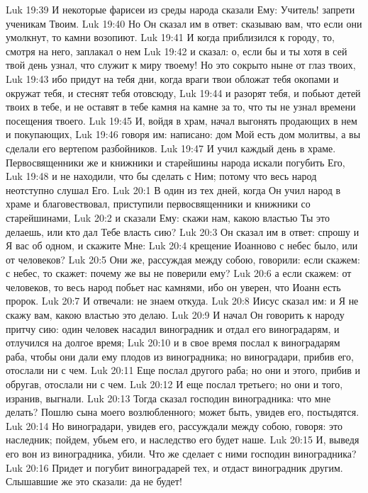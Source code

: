 Luk 19:39  И некоторые фарисеи из среды народа сказали Ему: Учитель! запрети ученикам Твоим.
Luk 19:40  Но Он сказал им в ответ: сказываю вам, что если они умолкнут, то камни возопиют.
Luk 19:41  И когда приблизился к городу, то, смотря на него, заплакал о нем
Luk 19:42  и сказал: о, если бы и ты хотя в сей твой день узнал, что служит к миру твоему! Но это сокрыто ныне от глаз твоих,
Luk 19:43  ибо придут на тебя дни, когда враги твои обложат тебя окопами и окружат тебя, и стеснят тебя отовсюду,
Luk 19:44  и разорят тебя, и побьют детей твоих в тебе, и не оставят в тебе камня на камне за то, что ты не узнал времени посещения твоего.
Luk 19:45  И, войдя в храм, начал выгонять продающих в нем и покупающих,
Luk 19:46  говоря им: написано: дом Мой есть дом молитвы, а вы сделали его вертепом разбойников.
Luk 19:47  И учил каждый день в храме. Первосвященники же и книжники и старейшины народа искали погубить Его,
Luk 19:48  и не находили, что бы сделать с Ним; потому что весь народ неотступно слушал Его.
Luk 20:1  В один из тех дней, когда Он учил народ в храме и благовествовал, приступили первосвященники и книжники со старейшинами,
Luk 20:2  и сказали Ему: скажи нам, какою властью Ты это делаешь, или кто дал Тебе власть сию?
Luk 20:3  Он сказал им в ответ: спрошу и Я вас об одном, и скажите Мне:
Luk 20:4  крещение Иоанново с небес было, или от человеков?
Luk 20:5  Они же, рассуждая между собою, говорили: если скажем: с небес, то скажет: почему же вы не поверили ему?
Luk 20:6  а если скажем: от человеков, то весь народ побьет нас камнями, ибо он уверен, что Иоанн есть пророк.
Luk 20:7  И отвечали: не знаем откуда.
Luk 20:8  Иисус сказал им: и Я не скажу вам, какою властью это делаю.
Luk 20:9  И начал Он говорить к народу притчу сию: один человек насадил виноградник и отдал его виноградарям, и отлучился на долгое время;
Luk 20:10  и в свое время послал к виноградарям раба, чтобы они дали ему плодов из виноградника; но виноградари, прибив его, отослали ни с чем.
Luk 20:11  Еще послал другого раба; но они и этого, прибив и обругав, отослали ни с чем.
Luk 20:12  И еще послал третьего; но они и того, изранив, выгнали.
Luk 20:13  Тогда сказал господин виноградника: что мне делать? Пошлю сына моего возлюбленного; может быть, увидев его, постыдятся.
Luk 20:14  Но виноградари, увидев его, рассуждали между собою, говоря: это наследник; пойдем, убьем его, и наследство его будет наше.
Luk 20:15  И, выведя его вон из виноградника, убили. Что же сделает с ними господин виноградника?
Luk 20:16  Придет и погубит виноградарей тех, и отдаст виноградник другим. Слышавшие же это сказали: да не будет!
